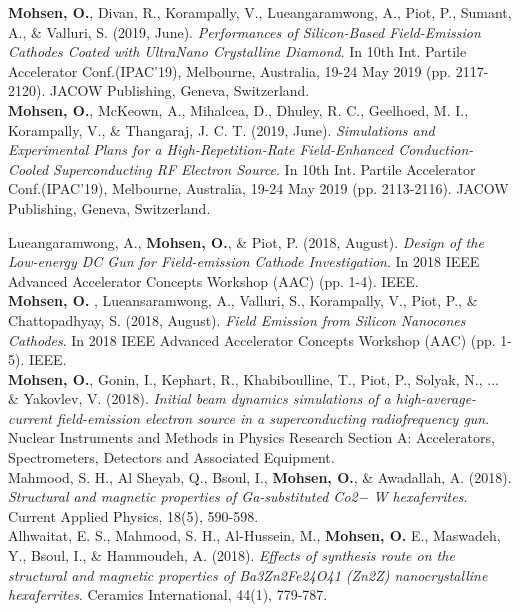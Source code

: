 \documentclass[a4paper,10pt]{article}
\begin{document}
\textbf{Mohsen, O.}, Divan, R., Korampally, V., Lueangaramwong, A., Piot, P., Sumant, A., \& Valluri, S. (2019, June). \textit{Performances of Silicon-Based Field-Emission Cathodes Coated with UltraNano Crystalline Diamond}. In 10th Int. Partile Accelerator Conf.(IPAC'19), Melbourne, Australia, 19-24 May 2019 (pp. 2117-2120). JACOW Publishing, Geneva, Switzerland.\\

\textbf{Mohsen, O.}, McKeown, A., Mihalcea, D., Dhuley, R. C., Geelhoed, M. I., Korampally, V., \& Thangaraj, J. C. T. (2019, June). \textit{Simulations and Experimental Plans for a High-Repetition-Rate Field-Enhanced Conduction-Cooled Superconducting RF Electron Source}. In 10th Int. Partile Accelerator Conf.(IPAC'19), Melbourne, Australia, 19-24 May 2019 (pp. 2113-2116). JACOW Publishing, Geneva, Switzerland.

Lueangaramwong, A., \textbf{Mohsen, O.}, \& Piot, P. (2018, August). \textit{Design of the Low-energy DC Gun for Field-emission Cathode Investigation}. In 2018 IEEE Advanced Accelerator Concepts Workshop (AAC) (pp. 1-4). IEEE. \\

\textbf{Mohsen, O.} , Lueansaramwong, A., Valluri, S., Korampally, V., Piot, P., \& Chattopadhyay, S. (2018, August). \textit{Field Emission from Silicon Nanocones Cathodes}. In 2018 IEEE Advanced Accelerator Concepts Workshop (AAC) (pp. 1-5). IEEE. \\

\textbf{Mohsen, O.}, Gonin, I., Kephart, R., Khabiboulline, T., Piot, P., Solyak, N., ... \& Yakovlev, V. (2018). \textit{Initial beam dynamics simulations of a high-average-current field-emission electron source in a superconducting radiofrequency gun}. Nuclear Instruments and Methods in Physics Research Section A: Accelerators, Spectrometers, Detectors and Associated Equipment. \\


Mahmood, S. H., Al Sheyab, Q., Bsoul, I., \textbf{ Mohsen, O.}, \& Awadallah, A. (2018). \textit{Structural and magnetic properties of Ga-substituted Co2− W hexaferrites}. Current Applied Physics, 18(5), 590-598. \\

Alhwaitat, E. S., Mahmood, S. H., Al-Hussein, M., \textbf{Mohsen, O.} E., Maswadeh, Y., Bsoul, I., \& Hammoudeh, A. (2018). \textit{Effects of synthesis route on the structural and magnetic properties of Ba3Zn2Fe24O41 (Zn2Z) nanocrystalline hexaferrites}. Ceramics International, 44(1), 779-787. \\
\end{document}
